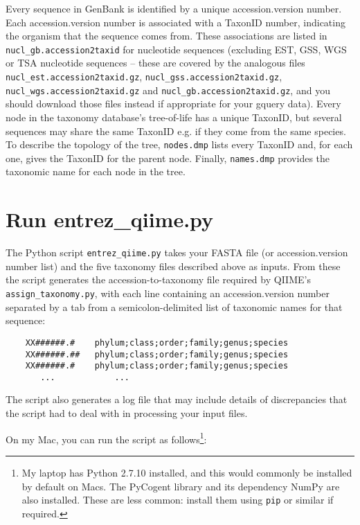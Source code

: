 \documentclass[11pt]{amsart}
\begin{document}
Every sequence in GenBank is identified by a unique accession.version number. Each accession.version number is associated with a TaxonID number, indicating the organism that the sequence comes from. These associations are listed in \verb|nucl_gb.accession2taxid| for nucleotide sequences (excluding EST, GSS, WGS or TSA nucleotide sequences -- these are covered by the analogous files \verb|nucl_est.accession2taxid.gz|, \verb|nucl_gss.accession2taxid.gz|, \verb|nucl_wgs.accession2taxid.gz| and \verb|nucl_gb.accession2taxid.gz|, and you should download those files instead if appropriate for your gquery data). Every node in the taxonomy database's tree-of-life has a unique TaxonID, but several sequences may share the same TaxonID e.g. if they come from the same species. To describe the topology of the tree, \verb|nodes.dmp| lists every TaxonID and, for each one, gives the TaxonID for the parent node. Finally, \verb|names.dmp| provides the taxonomic name for each node in the tree.

\section{Run entrez\_qiime.py}
\label{section:python}

The Python script \verb|entrez_qiime.py| takes your FASTA file (or accession.version number list) and the five taxonomy files described above as inputs. From these the script generates the accession-to-taxonomy file required by QIIME's \verb|assign_taxonomy.py|, with each line containing an accession.version number separated by a tab from a semicolon-delimited list of taxonomic names for that sequence:

\begin{verbatim}
    XX######.#    phylum;class;order;family;genus;species
    XX######.##   phylum;class;order;family;genus;species
    XX######.#    phylum;class;order;family;genus;species
       ...            ...
\end{verbatim}

The script also generates a log file that may include details of discrepancies that the script had to deal with in processing your input files.

On my Mac, you can run the script as follows\footnote{My laptop has Python 2.7.10 installed, and this would commonly be installed by default on Macs. The PyCogent library and its dependency NumPy are also installed. These are less common: install them using \texttt{pip} or similar if required.}:
\end{document}
